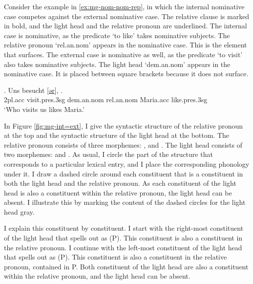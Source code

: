 Consider the example in \ref{ex:mg-nom-nom-rep}, in which the internal nominative case competes against the external nominative case. The relative clause is marked in bold, and the light head and the relative pronoun are underlined.
The internal case is nominative, as the predicate  `to like' takes nominative subjects. The relative pronoun  `\ac{rel}.\ac{an}.\ac{nom}' appears in the nominative case. This is the element that surfaces.
The external case is nominative as well, as the predicate  `to visit' also takes nominative subjects. The light head  `\ac{dem}.\ac{an}.\ac{nom}' appears in the nominative case. It is placed between square brackets because it does not surface.

\exg. Uns besucht [\underline{ər}], \underline{}  .\\
 2\ac{pl}.\ac{acc} visit.\ac{pres}.3\ac{sg}\scsub{[nom]} \ac{dem}.\ac{an}.\ac{nom} \ac{rel}.\ac{an}.\ac{nom} Maria.\ac{acc} like.\ac{pres}.3\ac{sg}\scsub{[nom]}\\
 `Who visits us likes Maria.' \label{ex:mg-nom-nom-rep}

In Figure \ref{fig:mg-int=ext}, I give the syntactic structure of the relative pronoun at the top and the syntactic structure of the light head at the bottom.
The relative pronoun consists of three morphemes: ,  and .
The light head consists of two morphemes:  and .
As usual, I circle the part of the structure that corresponds to a particular lexical entry, and I place the corresponding phonology under it.
I draw a dashed circle around each constituent that is a constituent in both the light head and the relative pronoun.
As each constituent of the light head is also a constituent within the relative pronoun, the light head can be absent. I illustrate this by marking the content of the dashed circles for the light head gray.

I explain this constituent by constituent.
I start with the right-most constituent of the light head that spells out as  (P). This constituent is also a constituent in the relative pronoun.
I continue with the left-most constituent of the light head that spells out as  (P). This constituent is also a constituent in the relative pronoun, contained in P.
Both constituent of the light head are also a constituent within the relative pronoun, and the light head can be absent.

